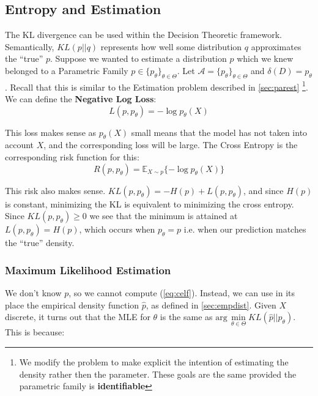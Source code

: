 \documentclass[]{article}
\theoremstyle{mattstyle}
\theoremstyle{definition}
\begin{document}
\subsection{Entropy and Estimation}

The KL divergence can be used within the Decision Theoretic framework. Semantically, $KL(p||q)$ represents how well some distribution $q$ approximates the ``true'' $p$. Suppose we wanted to estimate a distribution $p$ which we knew belonged to a Parametric Family  $p\in \{p_{\theta}\}_{\theta\in\Theta}$. Let \(\mathcal{A} = \{p_{\theta}\}_{\theta\in\Theta}\) and $\delta(D)=p_{\theta}$. Recall that this is similar to the Estimation problem described in \ref{sec:parest} \footnote{We modify the problem to make explicit the intention of estimating the density rather then the parameter. These goals are the same provided the parametric family is \textbf{identifiable}}.  We can define the \textbf{Negative Log Loss}:
\begin{equation}
L(p,p_{\theta}) = -\log p_{\theta}(X)
\end{equation}

This loss makes sense as $p_{\theta}(X)$ small means that the model has not taken into account $X$, and the corresponding loss will be large. The Cross Entropy is the corresponding risk function for this:
\begin{equation}\label{eq:celf}
R(p,p_{\theta}) = \mathbb{E}_{X\sim p}\{ -\log p_{\theta}(X) \}
\end{equation}	

This risk also makes sense. $KL(p,p_{\theta}) = -H(p) + L(p,p_{\theta})$, and since $H(p)$ is constant, minimizing the KL is equivalent to minimizing the cross entropy. Since $KL(p,p_{\theta}) \ge 0$ we see that the minimum is attained at $L(p,p_{\theta}) = H(p)$, which occurs when $p_{\theta}=p$ i.e. when our prediction matches the ``true'' density.

\newpage

\subsubsection{Maximum Likelihood Estimation}

We don't know $p$, so we cannot compute (\ref{eq:celf}). Instead, we can use in its place the empirical density function $\hat{p}$, as defined in \ref{sec:empdist}. Given $X$ discrete, it turns out that the MLE for $\theta$ is the same as $\text{arg}\,\min\limits_{\theta\in\Theta} KL(\hat{p}||p_{\theta})$. This is because:
\end{document}
